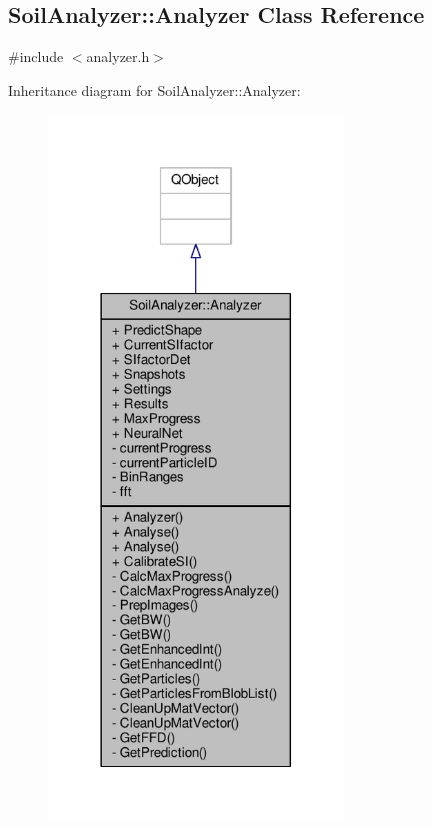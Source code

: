 \hypertarget{class_soil_analyzer_1_1_analyzer}{}\subsection{Soil\+Analyzer\+:\+:Analyzer Class Reference}
\label{class_soil_analyzer_1_1_analyzer}


{\ttfamily \#include $<$analyzer.\+h$>$}



Inheritance diagram for Soil\+Analyzer\+:\+:Analyzer\+:
\nopagebreak
\begin{figure}[H]
\begin{center}
\leavevmode
\includegraphics[width=222pt]{class_soil_analyzer_1_1_analyzer__inherit__graph}
\end{center}
\end{figure}


